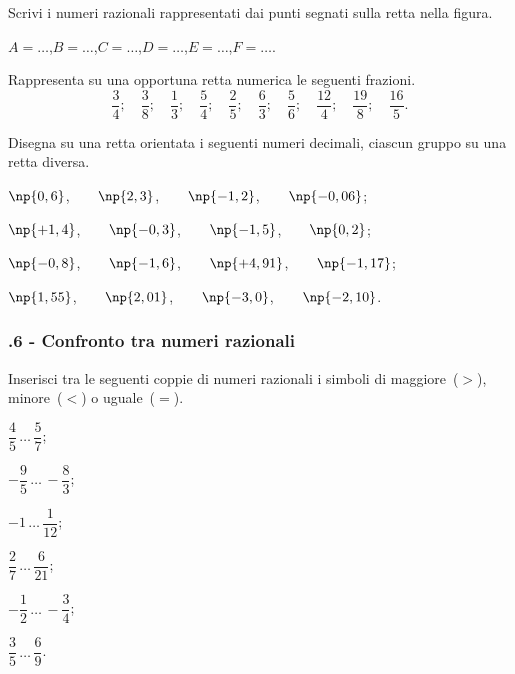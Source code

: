 \begin{esercizio}
 \label{ese:3.34}
 Scrivi i numeri razionali rappresentati dai punti segnati sulla retta nella figura.
\begin{center}

\end{center}
$ A=\ldots $,\quad $ B=\ldots $,\quad $ C=\ldots $,\quad $ D=\ldots $,\quad $ E=\ldots $,\quad $ F=\ldots $.

\end{esercizio}

\begin{esercizio}
 \label{ese:3.35}
Rappresenta su una opportuna retta numerica le seguenti frazioni.
\[\frac{3}{4};\quad\frac{3}{8};\quad\frac{1}{3};\quad\frac{5}{4};\quad\frac{2}{5};\quad\frac{6}{3};\quad\frac{5}{6};\quad%
\frac{12}{4};\quad\frac{19}{8};\quad\frac{16}{5}.\]
\end{esercizio}

\begin{esercizio}
 \label{ese:3.36}
Disegna su una retta orientata i seguenti numeri decimali, ciascun gruppo su una retta diversa.
\begin{enumeratea}
 \item $\np{0,6}$,$\qquad\np{2,3}$,$\qquad\np{-1,2}$,$\qquad\np{-0,06}$;
 \item $\np{+1,4}$,$\qquad\np{-0,3}$,$\qquad\np{-1,5}$,$\qquad\np{0,2}$;
 \item $\np{-0,8}$,$\qquad\np{-1,6}$,$\qquad\np{+4,91}$,$\qquad\np{-1,17}$;
 \item $\np{1,55}$,$\qquad\np{2,01}$,$\qquad\np{-3,0}$,$\qquad\np{-2,10}$.
\end{enumeratea}
\end{esercizio}
\pagebreak
\subsubsection*{\thechapter.6 - Confronto tra numeri razionali}

\begin{esercizio}
 \label{ese:3.37}
Inserisci tra le seguenti coppie di numeri razionali i simboli di maggiore~($>$), minore~($<$) o uguale~($=$).
\begin{multicols}{3}
\begin{enumeratea}
\spazielenx
 \item $\dfrac{4}{5}\,\ldots\,\dfrac{5}{7}$;
 \item $-\dfrac{9}{5}\,\ldots\,-\dfrac{8}{3}$;
 \item $-1\,\ldots\,\dfrac{1}{12}$;
 \item $\dfrac{2}{7}\,\ldots\,\dfrac{6}{21}$;
 \item $-\dfrac{1}{2}\,\ldots\,-\dfrac{3}{4}$;
 \item $\dfrac{3}{5}\,\ldots\,\dfrac{6}{9}$.
\end{enumeratea}
\end{multicols}
\end{esercizio}

